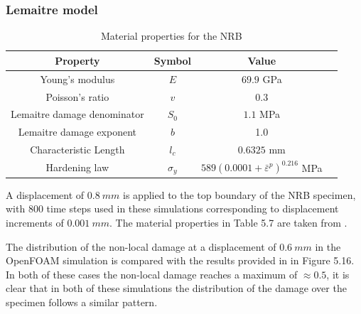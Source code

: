 \documentclass[sn-mathphys,Numbered,draft]{sn-jnl}%
\begin{document}
\subsubsection{Lemaitre model}

\begin{table}[htb]
	\centering
		\begin{tabular}{cccc} \hline
			Property & Symbol & Value  \\ \hline 
			Young's modulus & $E$ & $69.9$ GPa \\
			Poisson's ratio & $v$ & $0.3$   \\
			Lemaitre damage denominator & $S_0$ & $1.1$ MPa  \\
			Lemaitre damage exponent & $b$ & 1.0  \\
			Characteristic Length & $l_c$ & $0.6325$ mm  \\
			Hardening law & $\sigma_y$ & $589({0.0001+\bar{\varepsilon}}^p)^{0.216}$ MPa \\
			\hline
		\end{tabular}
	\caption{Material properties for the NRB}
	\label{tab:material_properties}
\end{table}

A displacement of $0.8\ mm$ is applied to the top boundary of the NRB specimen, with 800 time steps used in these simulations corresponding to displacement increments of $0.001\ mm$. The material properties in Table 5.7 are taken from \citet{cesar_de_sa_damage_2006}.

The distribution of the non-local damage at a displacement of $0.6\ mm$ in the OpenFOAM simulation is compared with the results provided in \citet{cesar_de_sa_damage_2006} in Figure 5.16. In both of these cases the non-local damage reaches a maximum of $\approx0.5$, it is clear that in both of these simulations the distribution of the damage over the specimen follows a similar pattern.
\end{document}
